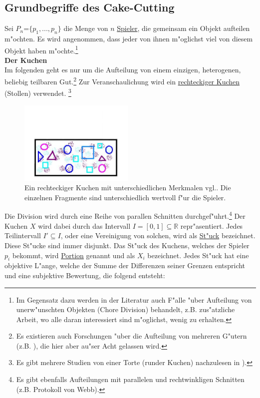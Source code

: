 \documentclass[11pt, a4paper, twoside]{article}
\numberwithin{equation}{section}
\begin{document}
\subsection{Grundbegriffe des Cake-Cutting}
Sei $P_n$=$\{p_1,...,p_n\}$ die Menge von $n$ \underline{Spieler}, die gemeinsam ein Objekt aufteilen m"ochten. Es wird angenommen, dass jeder von ihnen m"oglichst viel von diesem Objekt haben m"ochte.\footnote{Im Gegensatz dazu werden in der Literatur auch F"alle "uber Aufteilung von unerw"unschten Objekten (Chore Division) behandelt, z.B. zus"atzliche Arbeit, wo alle daran interessiert sind m"oglichst, wenig zu erhalten.}\\
\newline
\textbf{Der Kuchen}\\
\newline
Im folgenden geht es nur um die Aufteilung von einem einzigen, heterogenen, beliebig teilbaren Gut.\footnote{Es existieren auch Forschungen "uber die Aufteilung von mehreren G"utern (z.B. \cite{1}), die  hier aber au"ser Acht gelassen wird.} Zur Veranschaulichung wird ein \underline{rechteckiger Kuchen} (Stollen) verwendet. \footnote{Es gibt mehrere Studien von einer Torte (runder Kuchen) nachzulesen in \cite{31}).}
\begin{figure}[h!]
\center
\includegraphics[height=4cm]{kuch.jpg}
\caption[Beispiel f"ur einen Kuchen]{Ein rechteckiger Kuchen mit unterschiedlichen Merkmalen vgl.\cite{25}. Die einzelnen Fragmente sind unterschiedlich wertvoll f"ur die Spieler.}
\end{figure} Die Division wird durch eine Reihe von parallen Schnitten durchgef"uhrt.\footnote{Es gibt ebenfalls Aufteilungen mit parallelen und rechtwinkligen Schnitten (z.B. Protokoll von Webb).} Der Kuchen $X$ wird dabei durch das Intervall $I=[0,1]\subseteq \mathbb{R}$ repr"asentiert. Jedes Teilintervall $I'\subseteq I$, oder eine Vereinigung von solchen, wird als \underline{St"uck} bezeichnet. Diese St"ucke sind immer disjunkt. Das St"uck des Kuchens, welches der Spieler $p_i$ bekommt, wird \underline{Portion} genannt und als $X_i$ bezeichnet. Jedes St"uck hat eine objektive L"ange, welche der Summe der Differenzen seiner Grenzen entspricht und eine subjektive Bewertung, die folgend entsteht:\\
\end{document}
